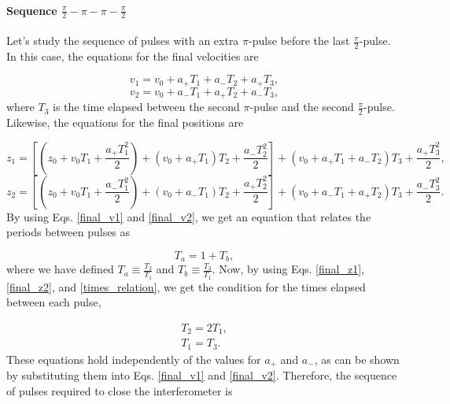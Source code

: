 \documentclass{article}
\begin{document}
\paragraph{Sequence $\frac{\pi}{2} - \pi - \pi - \frac{\pi}{2}$}

Let's study the sequence of pulses with an extra $\pi$-pulse before the last $\frac{\pi}{2}$-pulse. In this case, the equations for the final velocities are

\begin{equation}\label{final_v1}
v_{1} = v_{0} + a_{+} T_{1} + a_{-} T_{2} + a_{+} T_{3},
\end{equation}
\begin{equation}\label{final_v2}
v_{2} = v_{0} + a_{-} T_{1} + a_{+} T_{2} + a_{-} T_{3},
\end{equation}
%
where $T_{3}$ is the time elapsed between the second $\pi$-pulse and the second $\frac{\pi}{2}$-pulse. Likewise, the equations for the final positions are

\begin{equation}\label{final_z1}
z_{1} = [(z_{0} + v_{0} T_{1} + \frac{a_{+} T^{2}_{1}}{2}) + (v_{0} + a_{+}T_{1})T_{2} + \frac{a_{-} T^{2}_{2}}{2}] + (v_{0}+a_{+}T_{1} + a_{-}T_{2})T_{3} + \frac{a_{+} T^{2}_{3}}{2},
\end{equation}
\begin{equation}\label{final_z2}
z_{2} = [(z_{0} + v_{0} T_{1} + \frac{a_{-} T^{2}_{1}}{2}) + (v_{0} + a_{-}T_{1})T_{2} + \frac{a_{+} T^{2}_{2}}{2}] + (v_{0}+a_{-}T_{1} + a_{+}T_{2})T_{3} + \frac{a_{-} T^{2}_{3}}{2}.
\end{equation}
%
By using Eqs. \ref{final_v1} and \ref{final_v2}, we get an equation that relates the periods between pulses as

\begin{equation}\label{times_relation}
T_{a} = 1 + T_{b},
\end{equation}
%
where we have defined $T_{a} \equiv \frac{T_{2}}{T_{1}}$ and $T_{b} \equiv \frac{T_{3}}{T_{1}}$. Now, by using Eqs. \ref{final_z1}, \ref{final_z2}, and \ref{times_relation}, we get the condition for the times elapsed between each pulse,

\begin{equation}
\begin{aligned}
T_{2} = 2T_{1}, \\
T_{1} = T_{3}.
\end{aligned}
\end{equation}
%
These equations hold independently of the values for $a_{+}$ and $a_{-}$, as can be shown by substituting them into Eqs. \ref{final_v1} and \ref{final_v2}. Therefore, the sequence of pulses required to close the interferometer is 
\end{document}
